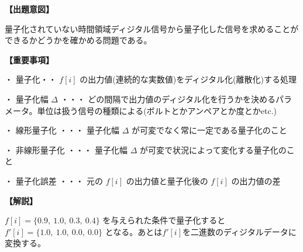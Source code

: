 \noindent \textbf{【出題意図】}

\noindent 量子化されていない時間領域ディジタル信号から量子化した信号を求めることができるかどうかを確かめる問題である。

\vspace{1em}
\noindent \textbf{【重要事項】}

\medskip
\noindent ・ 量子化・・ $f[i]$ の出力値(連続的な実数値)をディジタル化(離散化)する処理

\medskip
\noindent ・ 量子化幅 $\Delta$ ・・・ どの間隔で出力値のディジタル化を行うかを決めるパラメータ。単位は扱う信号の種類による(ボルトとかアンペアとか度とかetc.)

\medskip
\noindent ・ 線形量子化 ・・・ 量子化幅  $\Delta$ が可変でなく常に一定である量子化のこと

\medskip
\noindent ・ 非線形量子化 ・・・ 量子化幅  $\Delta$ が可変で状況によって変化する量子化のこと

\medskip
\noindent ・ 量子化誤差 ・・・ 元の $f[i]$ の出力値と量子化後の $f[i]$ の出力値の差

\vspace{1em}
\noindent \textbf{【解説】}

\noindent $f[i] = \{0.9,\ 1.0,\ 0.3,\ 0.4 \}$ を与えられた条件で量子化すると $f'[i] = \{1.0,\ 1.0,\ 0.0,\ 0.0 \}$ となる。あとは$f'[i]$を二進数のディジタルデータに変換する。
